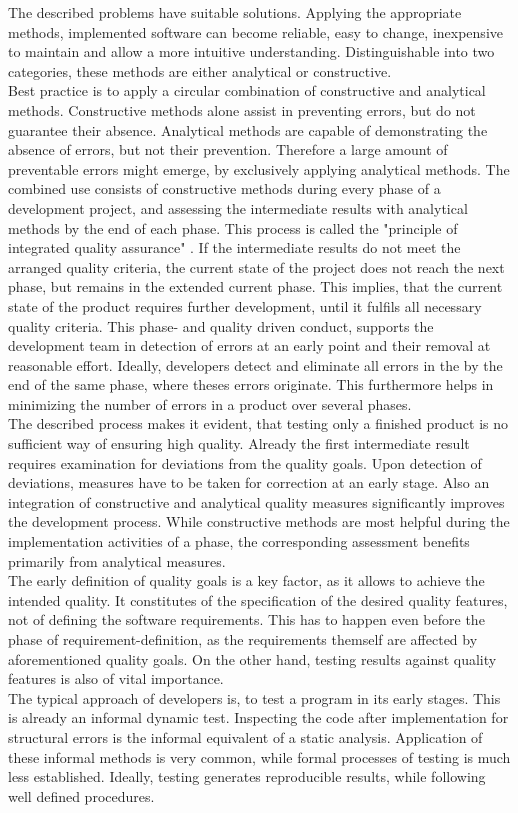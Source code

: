 The described problems have suitable solutions. Applying the appropriate methods, implemented software can become reliable, easy to change, inexpensive to maintain and allow a more intuitive understanding. Distinguishable into two categories, these methods are either analytical or constructive. \\
Best practice is to apply a circular combination of constructive and analytical methods. Constructive methods alone assist in preventing errors, but do not guarantee their absence. Analytical methods are capable of demonstrating the absence of errors, but not their prevention. Therefore a large amount of preventable errors might emerge, by exclusively applying analytical methods. The combined use consists of constructive methods during every phase of a development project, and assessing the intermediate results with analytical methods by the end of each phase. This process is called the "principle of integrated quality assurance" \cite{Liggesmeyer2002}. If the intermediate results do not meet the arranged quality criteria, the current state of the project does not reach the next phase, but remains in the extended current phase. This implies, that the current state of the product requires further development, until it fulfils all necessary quality criteria. This phase- and quality driven conduct, supports the development team in detection of errors at an early point and their removal at reasonable effort. Ideally, developers detect and eliminate all errors in the by the end of the same phase, where theses errors originate. This furthermore helps in minimizing the number of errors in a product over several phases. \\
The described process makes it evident, that testing only a finished product is no sufficient way of ensuring high quality. Already the first intermediate result requires examination for deviations from the quality goals. Upon detection of deviations, measures have to be taken for correction at an early stage. Also an integration of constructive and analytical quality measures significantly improves the development process. While constructive methods are most helpful during the implementation activities of a phase, the corresponding assessment benefits primarily from analytical measures. \\

The early definition of quality goals is a key factor, as it allows to achieve the intended quality. It constitutes of the specification of the desired quality features, not of defining the software requirements. This has to happen even before the phase of requirement-definition, as the requirements themself are affected by aforementioned quality goals. On the other hand, testing results against quality features is also of vital importance. \\ 
The typical approach of developers is, to test a program in its early stages. This is already an informal dynamic test. Inspecting the code after implementation for structural errors is the informal equivalent of a static analysis. Application of these informal methods is very common, while formal processes of testing is much less established. Ideally, testing generates reproducible results, while following well defined procedures.

